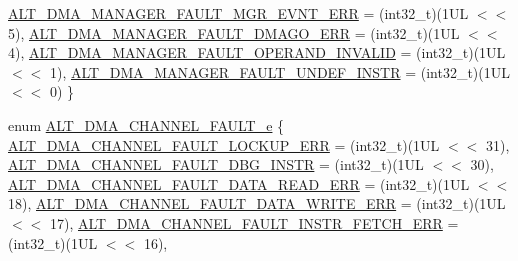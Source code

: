 \begin{DoxyCompactItemize}
\mbox{\hyperlink{group__ALT__DMA__CSR_ggab44582b3022f4047c4cdd70b80155e44aff7564e0e70db3e975b6092a4a615a50}{A\+L\+T\+\_\+\+D\+M\+A\+\_\+\+M\+A\+N\+A\+G\+E\+R\+\_\+\+F\+A\+U\+L\+T\+\_\+\+M\+G\+R\+\_\+\+E\+V\+N\+T\+\_\+\+E\+RR}} = (int32\+\_\+t)(1UL $<$$<$ 5), 
\mbox{\hyperlink{group__ALT__DMA__CSR_ggab44582b3022f4047c4cdd70b80155e44acde113e19e436e03d91452208a2b47ea}{A\+L\+T\+\_\+\+D\+M\+A\+\_\+\+M\+A\+N\+A\+G\+E\+R\+\_\+\+F\+A\+U\+L\+T\+\_\+\+D\+M\+A\+G\+O\+\_\+\+E\+RR}} = (int32\+\_\+t)(1UL $<$$<$ 4), 
\newline
\mbox{\hyperlink{group__ALT__DMA__CSR_ggab44582b3022f4047c4cdd70b80155e44a7cba8b2c4c80587090f84bb5f2506bcd}{A\+L\+T\+\_\+\+D\+M\+A\+\_\+\+M\+A\+N\+A\+G\+E\+R\+\_\+\+F\+A\+U\+L\+T\+\_\+\+O\+P\+E\+R\+A\+N\+D\+\_\+\+I\+N\+V\+A\+L\+ID}} = (int32\+\_\+t)(1UL $<$$<$ 1), 
\mbox{\hyperlink{group__ALT__DMA__CSR_ggab44582b3022f4047c4cdd70b80155e44a32f4c3b9d73e233d60ef43f47c70ada9}{A\+L\+T\+\_\+\+D\+M\+A\+\_\+\+M\+A\+N\+A\+G\+E\+R\+\_\+\+F\+A\+U\+L\+T\+\_\+\+U\+N\+D\+E\+F\+\_\+\+I\+N\+S\+TR}} = (int32\+\_\+t)(1UL $<$$<$ 0)
 \}
\item 
enum \mbox{\hyperlink{group__ALT__DMA__CSR_gafeda30cd49f28a7205b141ea8c653e3b}{A\+L\+T\+\_\+\+D\+M\+A\+\_\+\+C\+H\+A\+N\+N\+E\+L\+\_\+\+F\+A\+U\+L\+T\+\_\+e}} \{ \newline
\mbox{\hyperlink{group__ALT__DMA__CSR_ggafeda30cd49f28a7205b141ea8c653e3ba8f74283e13726c1c1d32c6f746ec563a}{A\+L\+T\+\_\+\+D\+M\+A\+\_\+\+C\+H\+A\+N\+N\+E\+L\+\_\+\+F\+A\+U\+L\+T\+\_\+\+L\+O\+C\+K\+U\+P\+\_\+\+E\+RR}} = (int32\+\_\+t)(1UL $<$$<$ 31), 
\mbox{\hyperlink{group__ALT__DMA__CSR_ggafeda30cd49f28a7205b141ea8c653e3baa00847b2b47665a32de570c241504d70}{A\+L\+T\+\_\+\+D\+M\+A\+\_\+\+C\+H\+A\+N\+N\+E\+L\+\_\+\+F\+A\+U\+L\+T\+\_\+\+D\+B\+G\+\_\+\+I\+N\+S\+TR}} = (int32\+\_\+t)(1UL $<$$<$ 30), 
\mbox{\hyperlink{group__ALT__DMA__CSR_ggafeda30cd49f28a7205b141ea8c653e3bab06f1d28e5f13b2f534f3eb9b2c072db}{A\+L\+T\+\_\+\+D\+M\+A\+\_\+\+C\+H\+A\+N\+N\+E\+L\+\_\+\+F\+A\+U\+L\+T\+\_\+\+D\+A\+T\+A\+\_\+\+R\+E\+A\+D\+\_\+\+E\+RR}} = (int32\+\_\+t)(1UL $<$$<$ 18), 
\mbox{\hyperlink{group__ALT__DMA__CSR_ggafeda30cd49f28a7205b141ea8c653e3bada279fdfee2adba43775a9c9efeffd01}{A\+L\+T\+\_\+\+D\+M\+A\+\_\+\+C\+H\+A\+N\+N\+E\+L\+\_\+\+F\+A\+U\+L\+T\+\_\+\+D\+A\+T\+A\+\_\+\+W\+R\+I\+T\+E\+\_\+\+E\+RR}} = (int32\+\_\+t)(1UL $<$$<$ 17), 
\newline
\mbox{\hyperlink{group__ALT__DMA__CSR_ggafeda30cd49f28a7205b141ea8c653e3baac3f25a384790891dad659ac6abd8f02}{A\+L\+T\+\_\+\+D\+M\+A\+\_\+\+C\+H\+A\+N\+N\+E\+L\+\_\+\+F\+A\+U\+L\+T\+\_\+\+I\+N\+S\+T\+R\+\_\+\+F\+E\+T\+C\+H\+\_\+\+E\+RR}} = (int32\+\_\+t)(1UL $<$$<$ 16), 
$$
\end{DoxyCompactItemize}
